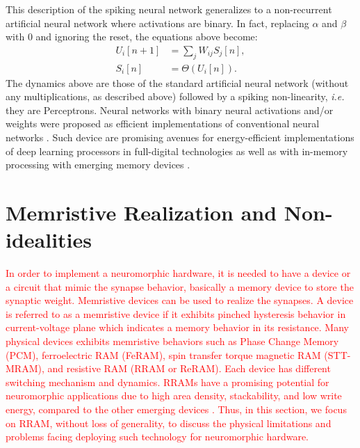 \documentclass[english]{article}
\renewcommand{\cite}{\citep}
\begin{document}
This description of the spiking neural network generalizes to a non-recurrent artificial neural network where activations are binary. In fact, replacing $\alpha$ and $\beta$ with 0 and ignoring the reset, the equations above become:
%
\begin{equation}
  \begin{split}\label{eq:perceptron}
    U_i[n+1] & = \sum_j W_{ij} S_j[n],\\
    S_i[n] &= \Theta(U_i[n]).
  \end{split}
\end{equation}
%
The dynamics above are those of the standard artificial neural network (without any multiplications, as described above) followed by a spiking non-linearity, \emph{i.e.} they are Perceptrons.
Neural networks with binary neural activations and/or weights were proposed as efficient implementations of conventional neural networks \cite{Courbariaux_etal16_binaneur,Rastegari_etal16_xnorimag}. Such device are promising avenues for energy-efficient implementations of deep learning processors in full-digital technologies \cite{Andri_etal16_yodaultr,Umuroglu_etal17_finnfram} as well as with in-memory processing with emerging memory devices \cite{Sun_etal18_fullpara}.



\section{ Memristive Realization and Non-idealities}

\textcolor{red}{In order to implement a neuromorphic hardware, it is needed to have a device or a circuit that mimic the synapse behavior, basically a memory device to store the synaptic weight. Memristive devices can be used to realize the synapses. A device is referred to as a memristive device if it exhibits pinched hysteresis behavior in current-voltage plane which indicates a memory behavior in its resistance. %
Many physical devices exhibits memristive behaviors such as Phase Change Memory (PCM), ferroelectric RAM (FeRAM), spin transfer torque magnetic RAM (STT-MRAM), and resistive RAM (RRAM or ReRAM). Each device has different switching mechanism and dynamics. RRAMs have a promising potential for neuromorphic applications due to high area density, stackability, and low write energy, compared to the other emerging devices \cite{wilson2013international}. Thus, in this section, we focus on RRAM, without loss of generality, to discuss the physical limitations and problems facing deploying such technology for neuromorphic hardware.}
\end{document}
